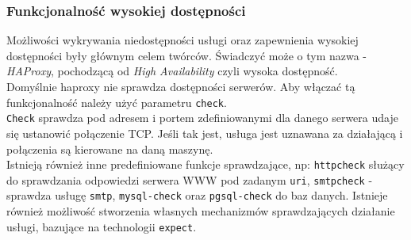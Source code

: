 {\subsubsection{Funkcjonalność wysokiej dostępności}
Możliwości wykrywania niedostępności usługi oraz zapewnienia wysokiej dostępności były głównym celem twórców.
Świadczyć może o tym nazwa - \textit{HAProxy}, pochodzącą od \textit{High Availability} czyli wysoka dostępność.\\
Domyślnie haproxy nie sprawdza dostępności serwerów. Aby włączać tą funkcjonalność należy użyć parametru \texttt{check}.\\
\texttt{Check} sprawdza pod adresem i portem zdefiniowanymi dla danego serwera udaje się ustanowić połączenie TCP.
Jeśli tak jest, usługa jest uznawana za działającą i połączenia są kierowane na daną maszynę.\\
Istnieją również inne predefiniowane funkcje sprawdzające, np: \texttt{httpcheck} służący do sprawdzania odpowiedzi serwera WWW pod zadanym \texttt{uri}, \texttt{smtpcheck} - sprawdza usługę \texttt{smtp}, \texttt{mysql-check} oraz \texttt{pgsql-check} do baz danych.
Istnieje również możliwość stworzenia własnych mechanizmów sprawdzających działanie usługi, bazujące na technologii \texttt{expect}.
}
